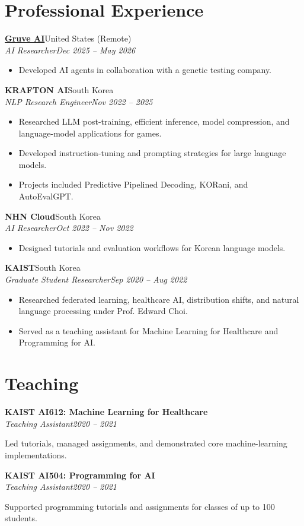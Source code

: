\documentclass[10pt,letterpaper]{article}
\newcommand{\entry}[4]{%
  \textbf{#1}\hfill {\small #2}\\[-1pt]
  \textit{#3}\hfill \textit{\small #4}\par\vspace{2pt}
}
\begin{document}
\newpage
\section*{Professional Experience}
\entry{\href{https://gruve.ai/}{Gruve AI}}{United States (Remote)}{AI Researcher}{Dec 2025 -- May 2026}
\begin{itemize}
  \item Developed AI agents in collaboration with a genetic testing company.
\end{itemize}

\entry{KRAFTON AI}{South Korea}{NLP Research Engineer}{Nov 2022 -- 2025}
\begin{itemize}
  \item Researched LLM post-training, efficient inference, model compression, and language-model applications for games.
  \item Developed instruction-tuning and prompting strategies for large language models.
  \item Projects included Predictive Pipelined Decoding, KORani, and AutoEvalGPT.
\end{itemize}

\entry{NHN Cloud}{South Korea}{AI Researcher}{Oct 2022 -- Nov 2022}
\begin{itemize}
  \item Designed tutorials and evaluation workflows for Korean language models.
\end{itemize}

\entry{KAIST}{South Korea}{Graduate Student Researcher}{Sep 2020 -- Aug 2022}
\begin{itemize}
  \item Researched federated learning, healthcare AI, distribution shifts, and natural language processing under Prof. Edward Choi.
  \item Served as a teaching assistant for Machine Learning for Healthcare and Programming for AI.
\end{itemize}

\section*{Teaching}
\entry{KAIST AI612: Machine Learning for Healthcare}{}{Teaching Assistant}{2020 -- 2021}
Led tutorials, managed assignments, and demonstrated core machine-learning implementations.

\vspace{4pt}
\entry{KAIST AI504: Programming for AI}{}{Teaching Assistant}{2020 -- 2021}
Supported programming tutorials and assignments for classes of up to 100 students.
\end{document}
